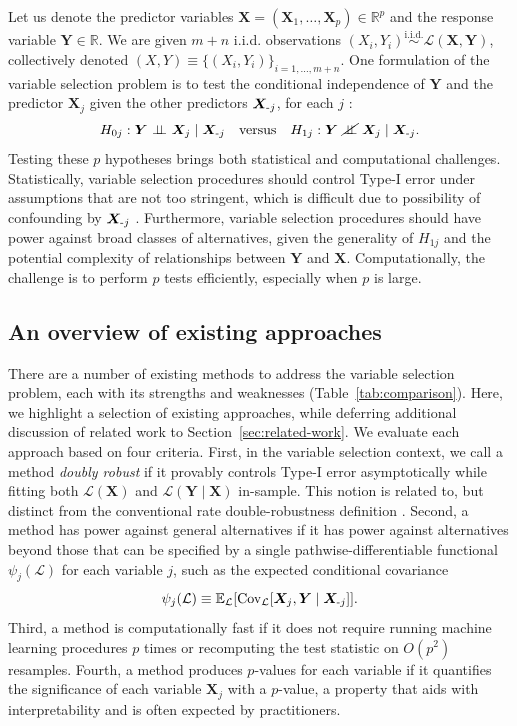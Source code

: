 \documentclass[12pt]{article}
\theoremstyle{definition}
\theoremstyle{remark}
\newcommand{\E}{\mathbb E}								%
\newcommand{\R}{\mathbb{R}}								%
\newcommand{\independent}{{\ \perp \! \! \! \perp\ }}	%
\newcommand{\nindependent}{\ \cancel{\perp \! \! \! \perp}\ } %
\newcommand{\iidsim}{\stackrel{\mathrm{i.i.d.}}{\sim}} 	%
\newcommand{\prx}{\bm X}								%
\newcommand{\srx}{X}									%
\newcommand{\pry}{{\bm Y}}								%
\newcommand{\sry}{Y}									%
\newcommand{\law}{\mathcal L}							%
\newcommand{\minus}{\textnormal{-}} 						    %
\begin{document}
	Let us denote the predictor variables $\prx = (\prx_1, \dots, \prx_p) \in \R^p$ and the response variable $\pry \in \R$. We are given $m + n$ i.i.d. observations $(\srx_{i}, \sry_i) \iidsim \law(\prx, \pry)$, collectively denoted $(\srx, \sry) \equiv \{(\srx_{i}, \sry_i)\}_{i = 1, \dots, m + n}$. One formulation of the variable selection problem is to test the conditional independence of $\pry$ and the predictor $\prx_j$ given the other predictors $\prx_{\minus j}$, for each $j$ \citep{CetL16}:
	\begin{equation}
		H_{0j}: \pry \independent \prx_j \mid \prx_{\minus j} \quad \textnormal{versus} \quad H_{1j}: \pry \nindependent \prx_j \mid \prx_{\minus j}.
		\label{eq:conditional-independence}
	\end{equation}
	Testing these $p$ hypotheses brings both statistical and computational challenges. Statistically, variable selection procedures should control Type-I error under assumptions that are not too stringent, which is difficult due to possibility of confounding by $\prx_{\minus j}$ \citep{Shah2018}. Furthermore, variable selection procedures should have power against broad classes of alternatives, given the generality of $H_{1j}$ and the potential complexity of relationships between $\pry$ and $\prx$. Computationally, the challenge is to perform $p$ tests efficiently, especially when $p$ is large.

	\subsection{An overview of existing approaches}

	There are a number of existing methods to address the variable selection problem, each with its strengths and weaknesses (Table~\ref{tab:comparison}). Here, we highlight a selection of existing approaches, while deferring additional discussion of related work to Section~\ref{sec:related-work}. We evaluate each approach based on four criteria. First, in the variable selection context, we call a method \textit{doubly robust} if it provably controls Type-I error asymptotically while fitting both $\law(\prx)$ and $\law(\pry \mid \prx)$ in-sample. This notion is related to, but distinct from the conventional rate double-robustness definition \citep{Smucler2019a}. Second, a method has power against general alternatives if it has power against alternatives beyond those that can be specified by a single pathwise-differentiable functional $\psi_j(\law)$ for each variable $j$, such as the expected conditional covariance 
	\begin{equation}
	\psi_j(\law) \equiv \E_{\law}[\textnormal{Cov}_{\law}[\prx_j, \pry \mid \prx_{\minus j}]]. 
	\label{eq:expected-conditional-covariance}
	\end{equation}
	Third, a method is computationally fast if it does not require running machine learning procedures $p$ times or recomputing the test statistic on $O(p^2)$ resamples. Fourth, a method produces $p$-values for each variable if it quantifies the significance of each variable $\prx_j$ with a $p$-value, a property that aids with interpretability and is often expected by practitioners.
	
\end{document}
